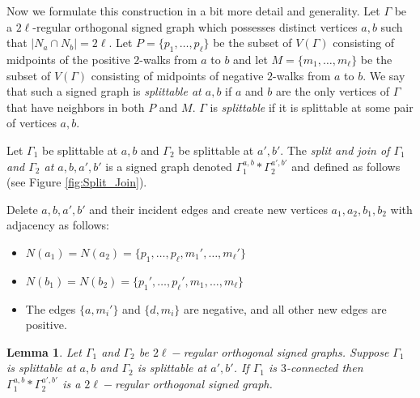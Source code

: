 \documentclass[11pt]{article}
\theoremstyle{plain}
\newtheorem{lemma}[theorem]{Lemma}
\theoremstyle{definition}
\begin{document}
Now we formulate this construction in a bit more detail and generality. Let $\Gamma$ be a $2\ell$-regular orthogonal signed graph which possesses distinct vertices $a,b$ such that $|N_a\cap N_b|=2\ell$. Let $P=\{p_1,\dots ,p_\ell\}$ be the subset of $V(\Gamma)$ consisting of  midpoints of the positive $2$-walks from $a$ to $b$ and let  $M=\{m_1,\dots, m_\ell\}$ be the subset of $V(\Gamma)$ consisting of midpoints of negative $2$-walks from $a$ to $b$. We say that such a signed graph is {\sl splittable at $a,b$} if $a$ and $b$ are the only vertices of $\Gamma$ that have neighbors in both $P$ and $M$. $\Gamma$ is {\sl splittable} if it is splittable at some pair of vertices $a,b$. 

Let $\Gamma_1$ be splittable at $a,b$ and $\Gamma_2$ be splittable at $a',b'$. The {\sl split and join of $\Gamma_1$ and $\Gamma_2$ at $a,b,a',b'$} is a signed graph denoted $\Gamma_1^{a,b}*\Gamma_2^{a',b'}$ and defined as follows (see Figure \ref{fig:Split_Join}).

Delete $a,b,a',b'$ and their incident edges and create new vertices $a_1,a_2,b_1,b_2$ with adjacency as follows: 
\begin{itemize}
    \item $N(a_1)=N(a_2)=\{p_1,\dots, p_\ell,m_1',\dots ,m_\ell'\}$
    
    \item $N(b_1)=N(b_2)=\{p_1',\dots, p_\ell',m_1,\dots, m_\ell\}$

    \item The edges $\{a,m_i'\}$ and $\{d,m_i\}$ are negative, and all other new edges are positive.
\end{itemize}


\begin{lemma}\label{Thm:Splitjoin}
Let $\Gamma_1$ and $\Gamma_2$ be $2\ell-$regular orthogonal signed graphs. Suppose $\Gamma_1$ is splittable at $a,b$ and $\Gamma_2$ is splittable at $a',b'$. If $\Gamma_1$ is $3$-connected then $\Gamma_1^{a,b}*\Gamma_2^{a',b'}$ is a $2\ell-$regular orthogonal signed graph.
\end{lemma}
\end{document}
